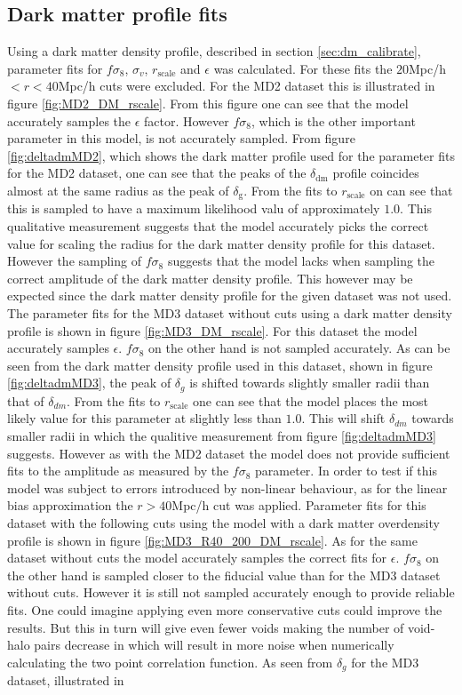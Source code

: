 \subsection{Dark matter profile fits}
Using a dark matter density profile, described in section \ref{sec:dm_calibrate}, parameter fits for $f\sigma_8$, $\sigma_v$, $r_\mathrm{scale}$ and $\epsilon$ was calculated. For these fits the $20$Mpc/h$<r<40$Mpc/h cuts were excluded. For the MD2 dataset this is illustrated in figure \ref{fig:MD2_DM_rscale}. From this figure one can see that the model accurately samples the $\epsilon$ factor. However $f\sigma_8$, which is the other important parameter in this model, is not accurately sampled. From figure \ref{fig:deltadmMD2}, which shows the dark matter profile used for the parameter fits for the MD2 dataset, one can see that the peaks of the $\delta_{\mathrm{dm}}$ profile coincides almost at the same radius as the peak of $\delta_\mathrm{g}$. From the fits to $r_\mathrm{scale}$ on can see that this is sampled to have a maximum likelihood valu of approximately $1.0$. This qualitative measurement suggests that the model accurately picks the correct value for scaling the radius for the dark matter density profile for this dataset. However the sampling of $f\sigma_8$ suggests that the model lacks when sampling the correct amplitude of the dark matter density profile. This however may be expected since the dark matter density profile for the given dataset was not used. The parameter fits for the MD3 dataset without cuts using a dark matter density profile is shown in figure \ref{fig:MD3_DM_rscale}. For this dataset the model accurately samples $\epsilon$. $f\sigma_8$ on the other hand is not sampled accurately. As can be seen from the dark matter density profile used in this dataset, shown in figure \ref{fig:deltadmMD3}, the peak of $\delta_g$ is shifted towards slightly smaller radii than that of $\delta_{dm}$. From the fits to $r_{\mathrm{scale}}$ one can see that the model places the most likely value for this parameter at slightly less than $1.0$. This will shift $\delta_{dm}$ towards smaller radii in which the qualitive measurement from figure \ref{fig:deltadmMD3} suggests. However as with the MD2 dataset the model does not provide sufficient fits to the amplitude as measured by the $f\sigma_8$ parameter. In order to test if this model was subject to errors introduced by non-linear behaviour, as for the linear bias approximation the $r>40$Mpc/h cut was applied. Parameter fits for this dataset with the following cuts using the model with a dark matter overdensity profile is shown in figure \ref{fig:MD3_R40_200_DM_rscale}. As for the same dataset without cuts the model accurately samples the correct fits for $\epsilon$. $f\sigma_8$ on the other hand is sampled closer to the fiducial value than for the MD3 dataset without cuts. However it is still not sampled accurately enough to provide reliable fits. One could imagine applying even more conservative cuts could improve the results. But this in turn will give even fewer voids making the number of void-halo pairs decrease in which will result in more noise when numerically calculating the two point correlation function. As seen from $\delta_g$ for the MD3 dataset, illustrated in 